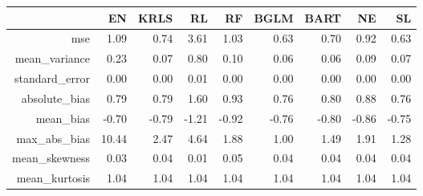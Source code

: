 \begin{table}[ht]
\centering
\begin{tabular}{rrrrrrrrr}
  \hline
 & EN & KRLS & RL & RF & BGLM & BART & NE & SL \\ 
  \hline
mse & 1.09 & 0.74 & 3.61 & 1.03 & 0.63 & 0.70 & 0.92 & 0.63 \\ 
  mean\_variance & 0.23 & 0.07 & 0.80 & 0.10 & 0.06 & 0.06 & 0.09 & 0.07 \\ 
  standard\_error & 0.00 & 0.00 & 0.01 & 0.00 & 0.00 & 0.00 & 0.00 & 0.00 \\ 
  absolute\_bias & 0.79 & 0.79 & 1.60 & 0.93 & 0.76 & 0.80 & 0.88 & 0.76 \\ 
  mean\_bias & -0.70 & -0.79 & -1.21 & -0.92 & -0.76 & -0.80 & -0.86 & -0.75 \\ 
  max\_abs\_bias & 10.44 & 2.47 & 4.64 & 1.88 & 1.00 & 1.49 & 1.91 & 1.28 \\ 
  mean\_skewness & 0.03 & 0.04 & 0.01 & 0.05 & 0.04 & 0.04 & 0.04 & 0.04 \\ 
  mean\_kurtosis & 1.04 & 1.04 & 1.04 & 1.04 & 1.04 & 1.04 & 1.04 & 1.04 \\ 
   \hline
\end{tabular}
\end{table}
